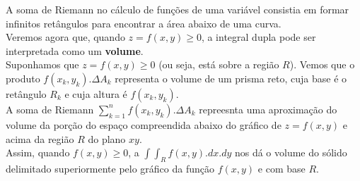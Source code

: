\documentclass{article}
\begin{document}
			A soma de Riemann no cálculo de funções de uma variável consistia em formar infinitos retângulos para encontrar a área abaixo de uma curva.\\
			Veremos agora que, quando $z = f(x,y) \geq 0$, a integral dupla pode ser interpretada como um \textbf{volume}.\\
			Suponhamos que $z=f(x,y) \geq 0$ (ou seja, está sobre a região $R$). Vemos que o produto $f(x_k,y_k).\Delta A_k$ representa o volume de um prisma reto, cuja base é o retângulo $R_k$ e cuja altura é $f(x_k,y_k)$.\\
			A soma de Riemann $\sum_{k=1}^n f(x_k,y_k). \Delta A_k$ repreesnta uma aproximação do volume da porção do espaço compreendida abaixo do gráfico de $z=f(x,y)$ e acima da região $R$ do plano $xy$.\\
			Assim, quando $f(x,y) \geq 0$, a $\int \int_R f(x,y).dx.dy$ nos dá o volume do sólido delimitado superiormente pelo gráfico da função $f(x,y)$ e com base $R$.
\end{document}
